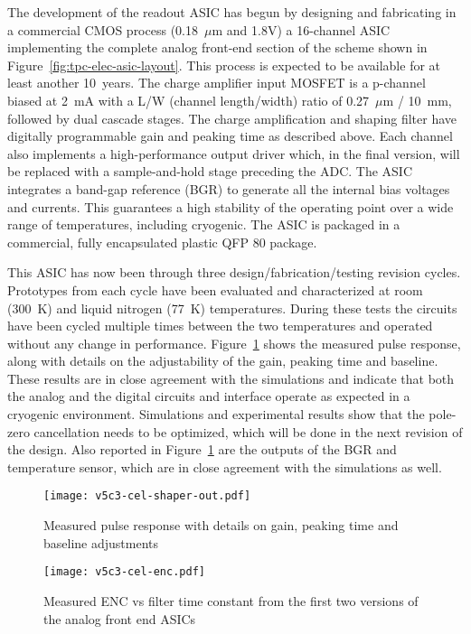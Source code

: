 The development of the readout ASIC has begun by designing and fabricating in a commercial CMOS
process (0.18~$\mu$m and 1.8V) a 16-channel
ASIC implementing the complete analog front-end section of the scheme shown in Figure~\ref{fig:tpc-elec-asic-layout}. 
This process is expected to be available for at least another 10~years. 
The charge
amplifier input MOSFET is a p-channel biased at 2~mA with a L/W (channel length/width) ratio
of 0.27~$\mu$m / 10~mm, followed by dual
cascade stages. The charge amplification and shaping filter have
digitally programmable gain and peaking time as described above. Each
channel also implements a high-performance output driver which, in the
final version, will be replaced with a sample-and-hold stage preceding
the ADC. The ASIC integrates a band-gap reference (BGR)  to
generate all the internal bias voltages and currents. This guarantees a
high stability of the operating point over a wide range of
temperatures, including cryogenic. The ASIC is packaged in a
commercial, fully encapsulated plastic QFP 80 package.

This ASIC has now been through three design/fabrication/testing revision cycles. Prototypes from each cycle have been evaluated and characterized at room (300~K) and liquid nitrogen
(77~K) temperatures. During these tests the circuits have been cycled multiple times
between the two temperatures and operated without any change in
performance. Figure~\ref{fig:tpc-elec-shaper-out} shows the measured pulse response, along with
details on the adjustability of the gain, peaking time and baseline.
These results are in close agreement with the simulations and indicate
that both the analog and the digital circuits and interface operate as
expected in a cryogenic environment. Simulations and experimental results
show that the pole-zero cancellation needs to be optimized, which will
be done in the next revision of the design. Also reported in Figure~\ref{fig:tpc-elec-shaper-out}  are
the outputs of the BGR and temperature sensor, which are in close
agreement with the simulations as well.

\begin{figure}[htbp]
\centering
\texttt{[image: v5c3-cel-shaper-out.pdf]}
\caption[Measured pulse response with details]{Measured pulse response with details on gain, peaking time and baseline adjustments}
\label{fig:tpc-elec-shaper-out}
\end{figure}


\begin{figure}[htbp]
\centering
\texttt{[image: v5c3-cel-enc.pdf]}
\caption[Measured ENC vs filter time constant]{Measured ENC vs filter time constant from the first two versions of the analog front end ASICs}
\label{fig:tpc-elec-enc}
\end{figure}


